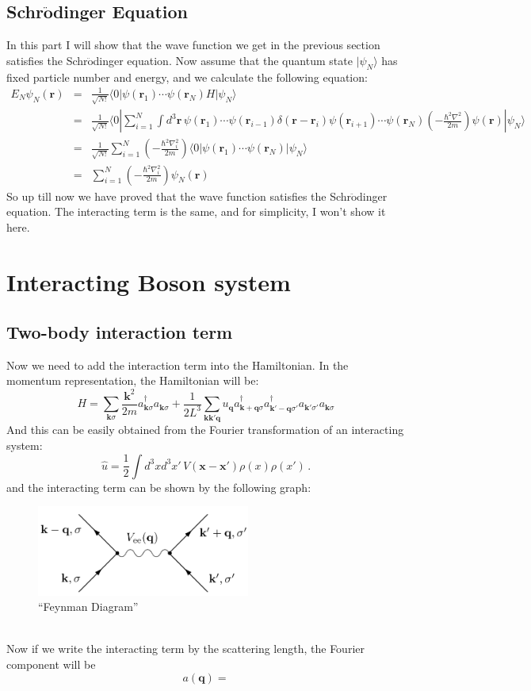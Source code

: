 \documentclass{article}
\newcommand{\mtq}{\mathbf{q}}
\newcommand{\mtk}{\mathbf{k}}
\newcommand{\pnx}{\mathbf{x}}
\newcommand{\pnr}{\mathbf{r}}
\begin{document}
\subsection{Schr$\ddot{\mathbf{o}}$dinger Equation}
In this part I will show that the wave function we get in the previous section satisfies the Schr$\ddot{\textrm{o}}$dinger equation. Now assume that the quantum state $|\psi_N\rangle$ has fixed particle number and energy, and we calculate the following equation:
\begin{eqnarray}
E_N\psi_N(\pnr) &=& \frac{1}{\sqrt{N!}}\langle 0| \psi(\pnr_1)\cdots  \psi(\pnr_N) H |\psi_N\rangle\nonumber\\
&=& \frac{1}{\sqrt{N!}}\langle 0| \sum_{i=1}^N  \int d^3 \pnr\,\psi(\pnr_1)\cdots \psi(\pnr_{i-1})\delta(\pnr-\pnr_i) \psi(\pnr_{i+1})\cdots  \psi(\pnr_N)\left(-\frac{\hbar^2\nabla^2}{2m}\right)\psi(\pnr)|\psi_N\rangle\nonumber\\
&=& \frac{1}{\sqrt{N!}}\sum_{i=1}^N (-\frac{\hbar^2\nabla_i^2}{2m})\langle 0| \psi(\pnr_1)\cdots  \psi(\pnr_N)|\psi_N\rangle \nonumber\\
&=& \sum_{i=1}^N (-\frac{\hbar^2\nabla_i^2}{2m})\psi_N(\pnr)
\end{eqnarray}
So up till now we have proved that the wave function satisfies the Schr$\ddot{\textrm{o}}$dinger equation. The interacting term is the same, and for simplicity, I won't show it here. 

\section{Interacting Boson system}
\subsection{Two-body interaction term}
Now we need to add the interaction term into the Hamiltonian. In the momentum representation, the Hamiltonian will be:
\begin{equation}
H=\sum_{\mtk\sigma}\frac{\mtk^2}{2m}a^\dagger_{\mtk\sigma}a_{\mtk\sigma} + \frac{1}{2L^3}\sum_{\mtk\mtk'\mtq}u_\mtq a^\dagger_{\mtk+\mtq\sigma}a^\dagger_{\mtk'-\mtq\sigma'}a_{\mtk'\sigma'}a_{\mtk\sigma}
\end{equation}
And this can be easily obtained from the Fourier transformation of an interacting system:
$$
\hat{u} = \frac{1}{2}\int d^3x d^3 x'\, V(\pnx-\pnx')\rho(x)\rho(x')\,.
$$
and the interacting term can be shown by the following graph:
\begin{figure}[!htp]
\centering
\includegraphics[width = 7cm]{./figure/pic2.png}
\caption{``Feynman Diagram''}
\end{figure}\\
Now if we write the interacting term by the scattering length, the Fourier component will be 
$$
a(\mtq) = 
$$
\end{document}
